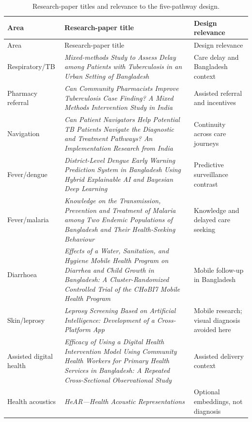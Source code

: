 \documentclass[12pt,onecolumn]{IEEEtran}
\begin{document}
\begin{longtable}{p{}p{}p{}}
\caption{Research-paper titles and relevance to the five-pathway design.}\label{tab:related}\\
\toprule Area & Research-paper title & Design relevance \\\midrule\endfirsthead
\toprule Area & Research-paper title & Design relevance \\\midrule\endhead
Respiratory/TB & \emph{Mixed-methods Study to Assess Delay among Patients with Tuberculosis in an Urban Setting of Bangladesh} \cite{ahmed2025delay} & Care delay and Bangladesh context \\
Pharmacy referral & \emph{Can Community Pharmacists Improve Tuberculosis Case Finding? A Mixed Methods Intervention Study in India} \cite{daftary2019pharmacy} & Assisted referral and incentives \\
Navigation & \emph{Can Patient Navigators Help Potential TB Patients Navigate the Diagnostic and Treatment Pathways? An Implementation Research from India} \cite{nayyar2021navigators} & Continuity across care journeys \\
Fever/dengue & \emph{District-Level Dengue Early Warning Prediction System in Bangladesh Using Hybrid Explainable AI and Bayesian Deep Learning} \cite{shiddik2026dengue} & Predictive surveillance contrast \\
Fever/malaria & \emph{Knowledge on the Transmission, Prevention and Treatment of Malaria among Two Endemic Populations of Bangladesh and Their Health-Seeking Behaviour} \cite{haque2009malaria} & Knowledge and delayed care seeking \\
Diarrhoea & \emph{Effects of a Water, Sanitation, and Hygiene Mobile Health Program on Diarrhea and Child Growth in Bangladesh: A Cluster-Randomized Controlled Trial of the CHoBI7 Mobile Health Program} \cite{george2021chobi7} & Mobile follow-up in Bangladesh \\
Skin/leprosy & \emph{Leprosy Screening Based on Artificial Intelligence: Development of a Cross-Platform App} \cite{desouza2021leprosy} & Mobile research; visual diagnosis avoided here \\
Assisted digital health & \emph{Efficacy of Using a Digital Health Intervention Model Using Community Health Workers for Primary Health Services in Bangladesh: A Repeated Cross-Sectional Observational Study} \cite{zaman2025bangladesh} & Assisted delivery context \\
Health acoustics & \emph{HeAR---Health Acoustic Representations} \cite{baur2024hear} & Optional embeddings, not diagnosis \\
\bottomrule
\end{longtable}
\end{document}
